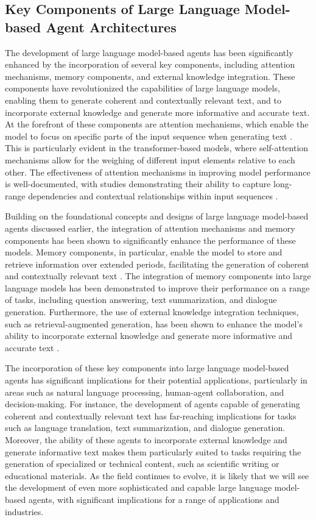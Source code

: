 \documentclass[11pt,a4paper]{article}
\begin{document}
\subsection{Key Components of Large Language Model-based Agent Architectures}


The development of large language model-based agents has been significantly enhanced by the incorporation of several key components, including attention mechanisms, memory components, and external knowledge integration. These components have revolutionized the capabilities of large language models, enabling them to generate coherent and contextually relevant text, and to incorporate external knowledge and generate more informative and accurate text. At the forefront of these components are attention mechanisms, which enable the model to focus on specific parts of the input sequence when generating text \cite{arxiv:1412.6980}. This is particularly evident in the transformer-based models, where self-attention mechanisms allow for the weighing of different input elements relative to each other. The effectiveness of attention mechanisms in improving model performance is well-documented, with studies demonstrating their ability to capture long-range dependencies and contextual relationships within input sequences \cite{arxiv:2402.15627}.

Building on the foundational concepts and designs of large language model-based agents discussed earlier, the integration of attention mechanisms and memory components has been shown to significantly enhance the performance of these models. Memory components, in particular, enable the model to store and retrieve information over extended periods, facilitating the generation of coherent and contextually relevant text \cite{doi:10.1145/3748302}. The integration of memory components into large language models has been demonstrated to improve their performance on a range of tasks, including question answering, text summarization, and dialogue generation. Furthermore, the use of external knowledge integration techniques, such as retrieval-augmented generation, has been shown to enhance the model's ability to incorporate external knowledge and generate more informative and accurate text \cite{arxiv:2401.02777}.

The incorporation of these key components into large language model-based agents has significant implications for their potential applications, particularly in areas such as natural language processing, human-agent collaboration, and decision-making. For instance, the development of agents capable of generating coherent and contextually relevant text has far-reaching implications for tasks such as language translation, text summarization, and dialogue generation. Moreover, the ability of these agents to incorporate external knowledge and generate informative text makes them particularly suited to tasks requiring the generation of specialized or technical content, such as scientific writing or educational materials. As the field continues to evolve, it is likely that we will see the development of even more sophisticated and capable large language model-based agents, with significant implications for a range of applications and industries.
\end{document}
